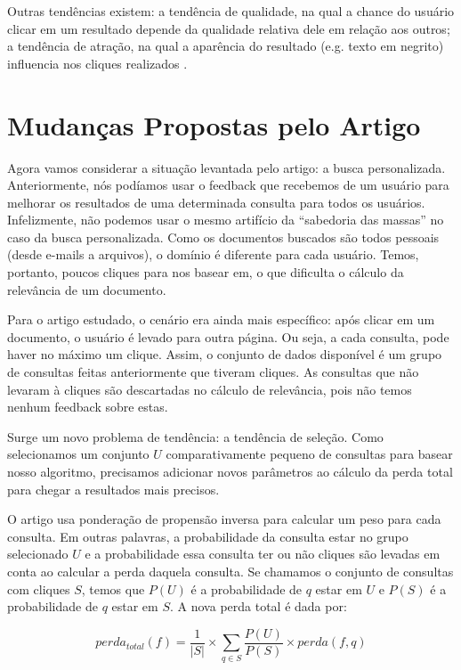 \documentclass{svproc}
\begin{document}
Outras tendências existem: a tendência de qualidade, na qual a chance do usuário clicar em um resultado
depende da qualidade relativa dele em relação aos outros; a tendência de atração, na qual a aparência do resultado 
(e.g. texto em negrito) influencia nos cliques realizados \cite{yue:patel:roehrig}.


\section{Mudanças Propostas pelo Artigo}

Agora vamos considerar a situação levantada pelo artigo: a busca personalizada. Anteriormente, nós podíamos usar o feedback
que recebemos de um usuário para melhorar os resultados de uma determinada consulta para todos os usuários. Infelizmente,
não podemos usar o mesmo artifício da ``sabedoria das massas'' no caso da busca personalizada. Como os documentos buscados
são todos pessoais (desde e-mails a arquivos), o domínio é diferente para cada usuário. Temos, portanto, poucos cliques para
nos basear em, o que dificulta o cálculo da relevância de um documento.

Para o artigo estudado, o cenário era ainda mais específico: após clicar em um documento, o usuário é levado para outra página.
Ou seja, a cada consulta, pode haver no máximo um clique. Assim, o conjunto de dados disponível é um grupo de consultas feitas 
anteriormente que tiveram cliques. As consultas que não levaram à cliques são descartadas no cálculo de relevância, pois não 
temos nenhum feedback sobre estas.

Surge um novo problema de tendência: a tendência de seleção. Como selecionamos um conjunto $U$ comparativamente pequeno de 
consultas para basear nosso algoritmo, precisamos adicionar novos parâmetros ao cálculo da perda total para chegar a 
resultados mais precisos.

O artigo usa ponderação de propensão inversa para calcular um peso para cada consulta. Em outras palavras, a 
probabilidade da consulta estar no grupo selecionado $U$ e a probabilidade essa consulta ter ou não cliques são levadas em
conta ao calcular a perda daquela consulta. Se chamamos o conjunto de consultas com cliques $S$, temos que $P(U)$ é a 
probabilidade de $q$ estar em $U$ e $P(S)$ é a probabilidade de $q$ estar em $S$. A nova perda total é dada por:

\begin{equation}
perda_{total}(f) = \frac{1}{|S|}\times \sum_{q \in S} \frac{P(U)}{P(S)} \times perda(f, q)
\end{equation}
\end{document}
